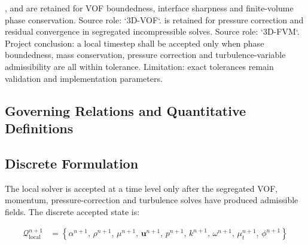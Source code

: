 %

\textcite{hirt1981vof}, \textcite{roenby2016computational} and
\textcite{vukcevic2018sharp} are retained for VOF boundedness,
interface sharpness and finite-volume phase conservation. Source role:
`3D-VOF`. \textcite{issa1986operator} is retained for pressure
correction and residual convergence in segregated incompressible
solves. Source role: `3D-FVM`. Project conclusion: a local timestep
shall be accepted only when phase boundedness, mass conservation,
pressure correction and turbulence-variable admissibility are all
within tolerance. Limitation: exact tolerances remain validation and
implementation parameters.

\subsection{Governing Relations and Quantitative Definitions}
\label{sec:res-num-stb-governing-relations}

%

\subsection{Discrete Formulation}
\label{sec:res-num-stb-discrete-formulation}


The local solver is accepted at a time level only after the segregated
VOF, momentum, pressure-correction and turbulence solves have produced
admissible fields. The discrete accepted state is:

\begin{align}
  \mathcal{Q}^{n+1}_{\mathrm{local}}
  &=
  \left\{
    \alpha^{n+1},\,
    \rho^{n+1},\,
    \mu^{n+1},\,
    \mathbf{u}^{n+1},\,
    p^{n+1},\,
    k^{n+1},\,
    \omega^{n+1},\,
    \mu_t^{n+1},\,
    \phi^{n+1}
  \right\}
  \label{eq:res-num-stb-local-accepted-state}
\end{align}

